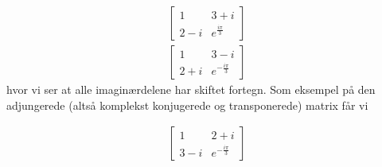 \documentclass[letterpaper,10pt,english]{jupyterBook}
\begin{document}
\begin{sphinxVerbatim}[commandchars=\\\{\}]
     

  \PYG{p}{[}\PYG{p}{[} \PYG{p}{]} \PYG{p}{[} \PYG{p}{]}\PYG{p}{]}
\end{sphinxVerbatim}
\begin{equation*}
\begin{split}\displaystyle \left[\begin{matrix}1 & 3 + i\\2 - i & e^{\frac{i \pi}{3}}\end{matrix}\right]\end{split}
\end{equation*}\begin{equation*}
\begin{split}\displaystyle \left[\begin{matrix}1 & 3 - i\\2 + i & e^{- \frac{i \pi}{3}}\end{matrix}\right]\end{split}
\end{equation*}
hvor vi ser at alle imaginærdelene har skiftet fortegn.
Som eksempel på den adjungerede (altså komplekst konjugerede og transponerede) matrix får vi

\begin{sphinxVerbatim}[commandchars=\\\{\}]
     
\end{sphinxVerbatim}
\begin{equation*}
\begin{split}\displaystyle \left[\begin{matrix}1 & 2 + i\\3 - i & e^{- \frac{i \pi}{3}}\end{matrix}\right]\end{split}
\end{equation*}
\end{document}
